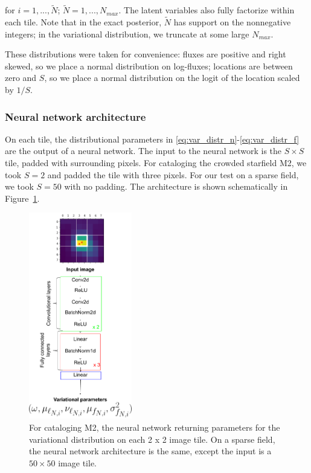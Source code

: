 for $i = 1, ..., \tilde N$; $\tilde N = 1, ..., N_{max}$. The latent variables also fully factorize within each tile. Note that in the exact posterior, $\tilde N$ has support on the nonnegative integers; in the variational distribution, we truncate at some large $N_{max}$. 


These distributions were taken for convenience: fluxes are positive and right skewed, so we place a normal distribution on log-fluxes; locations are between zero and $S$, so 
we place a normal distribution on the logit of the location scaled by $1 / S$. 

\subsubsection{Neural network architecture}
\label{sec:nn_archetecture}
On each tile, the distributional parameters 
in \eqref{eq:var_distr_n}-\eqref{eq:var_distr_f} are the output of a neural network.
The input to the neural network is the $S \times S$ tile, padded with surrounding pixels.
For cataloging the crowded starfield M2,
we took $S = 2$ and padded the tile with three pixels. 
For our test on a sparse field, we took $S = 50$ with no padding. 
The architecture is shown schematically in Figure~\ref{fig:starnet_arch}. 

\begin{figure}[!ht]
    \centering
    \includegraphics[width=0.4\textwidth]{figures/starnet_archetecture2.png}
    \vspace{-0.5cm}
    \caption{For cataloging M2, the neural network returning parameters for the variational distribution on each 2 x 2 image tile.
    On a sparse field, the neural network architecture is the same, 
    except the input is a $50 \times 50$ image tile. }
    \label{fig:starnet_arch}
\end{figure}

